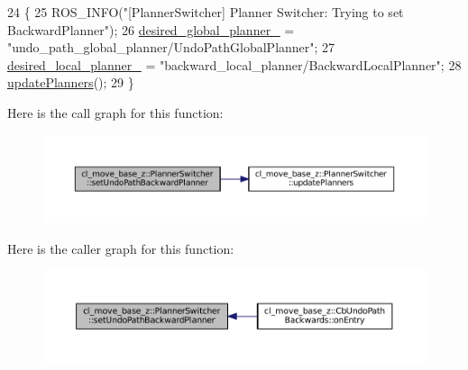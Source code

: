 \begin{DoxyCode}
24 \{
25   ROS\_INFO(\textcolor{stringliteral}{"[PlannerSwitcher] Planner Switcher: Trying to set BackwardPlanner"});
26   \hyperlink{classcl__move__base__z_1_1PlannerSwitcher_aef047d3778b2993c1df146bbad43e03d}{desired\_global\_planner\_} = \textcolor{stringliteral}{"undo\_path\_global\_planner/UndoPathGlobalPlanner"};
27   \hyperlink{classcl__move__base__z_1_1PlannerSwitcher_a6cbf65f11bb69125f913caaabdf7b4cf}{desired\_local\_planner\_} = \textcolor{stringliteral}{"backward\_local\_planner/BackwardLocalPlanner"};
28   \hyperlink{classcl__move__base__z_1_1PlannerSwitcher_a146641f63aea3185daab4c5cbb789550}{updatePlanners}();
29 \}
\end{DoxyCode}
Here is the call graph for this function\+:
\nopagebreak
\begin{figure}[H]
\begin{center}
\leavevmode
\includegraphics[width=350pt]{classcl__move__base__z_1_1PlannerSwitcher_a22df6956c30a8e0ab4b942742cc8dafd_cgraph}
\end{center}
\end{figure}
Here is the caller graph for this function\+:
\nopagebreak
\begin{figure}[H]
\begin{center}
\leavevmode
\includegraphics[width=350pt]{classcl__move__base__z_1_1PlannerSwitcher_a22df6956c30a8e0ab4b942742cc8dafd_icgraph}
\end{center}
\end{figure}
\mbox{\label{classcl__move__base__z_1_1PlannerSwitcher_a146641f63aea3185daab4c5cbb789550}} 

